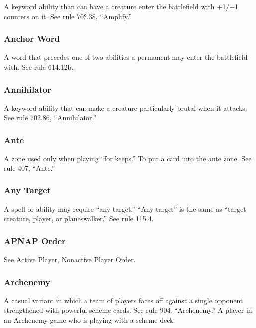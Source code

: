 {A keyword ability than can have a creature enter the battlefield with +1/+1 counters on it. See rule 702.38, “Amplify.”

\subsubsection*{Anchor Word}

A word that precedes one of two abilities a permanent may enter the battlefield with. See rule 614.12b.

\subsubsection*{Annihilator}

A keyword ability that can make a creature particularly brutal when it attacks. See rule 702.86, “Annihilator.”

\subsubsection*{Ante}

A zone used only when playing “for keeps.”
To put a card into the ante zone.
See rule 407, “Ante.”

\subsubsection*{Any Target}

A spell or ability may require “any target.” “Any target” is the same as “target creature, player, or planeswalker.” See rule 115.4.

\subsubsection*{APNAP Order}

See Active Player, Nonactive Player Order.

\subsubsection*{Archenemy}

A casual variant in which a team of players faces off against a single opponent strengthened with powerful scheme cards. See rule 904, “Archenemy.”
A player in an Archenemy game who is playing with a scheme deck.

}
